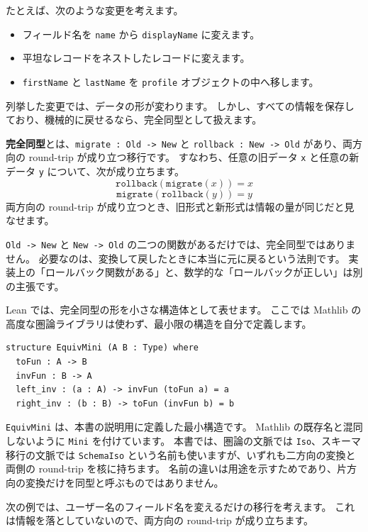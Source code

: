 たとえば、次のような変更を考えます。

\begin{itemize}
\item フィールド名を \texttt{name} から \texttt{displayName} に変えます。
\item 平坦なレコードをネストしたレコードに変えます。
\item \texttt{firstName} と \texttt{lastName} を \texttt{profile} オブジェクトの中へ移します。
\end{itemize}

列挙した変更では、データの形が変わります。
しかし、すべての情報を保存しており、機械的に戻せるなら、完全同型として扱えます。

\textbf{完全同型}とは、\texttt{migrate : Old -> New} と \texttt{rollback : New -> Old} があり、両方向の round-trip が成り立つ移行です。
すなわち、任意の旧データ \texttt{x} と任意の新データ \texttt{y} について、次が成り立ちます。
\[
\texttt{rollback}(\texttt{migrate}(x)) = x
\]
\[
\texttt{migrate}(\texttt{rollback}(y)) = y
\]
両方向の round-trip が成り立つとき、旧形式と新形式は情報の量が同じだと見なせます。

\texttt{Old -> New} と \texttt{New -> Old} の二つの関数があるだけでは、完全同型ではありません。
必要なのは、変換して戻したときに本当に元に戻るという法則です。
実装上の「ロールバック関数がある」と、数学的な「ロールバックが正しい」は別の主張です。

Lean では、完全同型の形を小さな構造体として表せます。
ここでは Mathlib の高度な圏論ライブラリは使わず、最小限の構造を自分で定義します。

\begin{listing}[htbp]
\begin{verbatim}
structure EquivMini (A B : Type) where
  toFun : A -> B
  invFun : B -> A
  left_inv : (a : A) -> invFun (toFun a) = a
  right_inv : (b : B) -> toFun (invFun b) = b
\end{verbatim}
\caption{\texttt{EquivMini}}
\label{lst:ch27-equivlike}
\end{listing}

\texttt{EquivMini} は、本書の説明用に定義した最小構造です。
Mathlib の既存名と混同しないように \texttt{Mini} を付けています。
本書では、圏論の文脈では \texttt{Iso}、スキーマ移行の文脈では \texttt{SchemaIso} という名前も使いますが、いずれも二方向の変換と両側の round-trip を核に持ちます。
名前の違いは用途を示すためであり、片方向の変換だけを同型と呼ぶものではありません。

次の例では、ユーザー名のフィールド名を変えるだけの移行を考えます。
これは情報を落としていないので、両方向の round-trip が成り立ちます。

